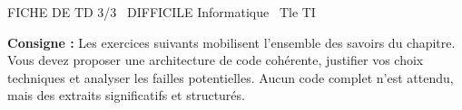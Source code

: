 \documentclass[11pt]{article}
\begin{document}
\begin{tcolorbox}[enhanced,colback=popink,colframe=popink,arc=10pt,boxrule=0pt,left=12pt,right=12pt,top=9pt,bottom=9pt]
{\color{white}\popxbold\small FICHE DE TD 3/3 \textbullet\ DIFFICILE \hfill Informatique \textbullet\ Tle TI\par}
\end{tcolorbox}
\vspace{4pt}
\noindent \textbf{Consigne :} Les exercices suivants mobilisent l'ensemble des savoirs du chapitre. Vous devez proposer une architecture de code cohérente, justifier vos choix techniques et analyser les failles potentielles. Aucun code complet n'est attendu, mais des extraits significatifs et structurés.
\end{document}
